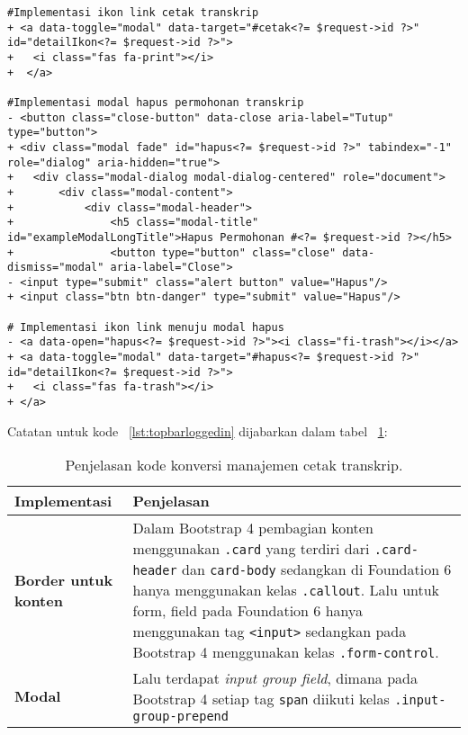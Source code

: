 \begin{lstlisting}
#Implementasi ikon link cetak transkrip
+ <a data-toggle="modal" data-target="#cetak<?= $request->id ?>" id="detailIkon<?= $request->id ?>">
+  	<i class="fas fa-print"></i>
+  </a>

#Implementasi modal hapus permohonan transkrip
- <button class="close-button" data-close aria-label="Tutup" type="button">
+ <div class="modal fade" id="hapus<?= $request->id ?>" tabindex="-1" role="dialog" aria-hidden="true">
+ 	<div class="modal-dialog modal-dialog-centered" role="document">
+ 		<div class="modal-content">
+ 			<div class="modal-header">
+ 				<h5 class="modal-title" id="exampleModalLongTitle">Hapus Permohonan #<?= $request->id ?></h5>
+ 				<button type="button" class="close" data-dismiss="modal" aria-label="Close">
- <input type="submit" class="alert button" value="Hapus"/>
+ <input class="btn btn-danger" type="submit" value="Hapus"/>

# Implementasi ikon link menuju modal hapus
- <a data-open="hapus<?= $request->id ?>"><i class="fi-trash"></i></a>
+ <a data-toggle="modal" data-target="#hapus<?= $request->id ?>" id="detailIkon<?= $request->id ?>">
+ 	<i class="fas fa-trash"></i>
+ </a>
\end{lstlisting}
\noindent Catatan untuk kode ~\ref{lst:topbarloggedin} dijabarkan dalam tabel ~\ref{tabel:KodeManajemenCetakTranskrip}:
\begin{table}[H]
	\centering
	\begin{tabularx}{\textwidth}{lX}
		\toprule
		Implementasi     & Penjelasan \\
		\midrule
		\textbf{Border untuk konten} & Dalam Bootstrap 4 pembagian konten menggunakan \texttt{.card} yang terdiri dari \texttt{.card-header} dan \texttt{card-body} sedangkan di Foundation 6 hanya menggunakan kelas \texttt{.callout}. Lalu untuk form, field pada Foundation 6 hanya menggunakan tag \texttt{<input>} sedangkan pada Bootstrap 4 menggunakan kelas \texttt{.form-control}.\\
		\textbf{Modal}  & Lalu terdapat \textit{input group field}, dimana pada Bootstrap 4 setiap tag \texttt{span} diikuti kelas \texttt{.input-group-prepend}\\
		\bottomrule
	\end{tabularx}%
	\caption{Penjelasan kode konversi manajemen cetak transkrip.}
	\label{tabel:KodeManajemenCetakTranskrip}
\end{table}

